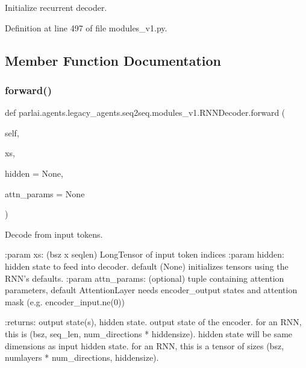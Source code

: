 \begin{DoxyVerb}Initialize recurrent decoder.\end{DoxyVerb}
 

Definition at line 497 of file modules\+\_\+v1.\+py.



\subsection{Member Function Documentation}
\mbox{\label{classparlai_1_1agents_1_1legacy__agents_1_1seq2seq_1_1modules__v1_1_1RNNDecoder_aa0fdddaf98d3385b432a9b52a0d1adbb}} 
\subsubsection{\texorpdfstring{forward()}{forward()}}
{\footnotesize\ttfamily def parlai.\+agents.\+legacy\+\_\+agents.\+seq2seq.\+modules\+\_\+v1.\+R\+N\+N\+Decoder.\+forward (\begin{DoxyParamCaption}\item[{}]{self,  }\item[{}]{xs,  }\item[{}]{hidden = {\ttfamily None},  }\item[{}]{attn\+\_\+params = {\ttfamily None} }\end{DoxyParamCaption})}

\begin{DoxyVerb}Decode from input tokens.

:param xs:          (bsz x seqlen) LongTensor of input token indices
:param hidden:      hidden state to feed into decoder. default (None)
            initializes tensors using the RNN's defaults.
:param attn_params: (optional) tuple containing attention parameters,
            default AttentionLayer needs encoder_output states
            and attention mask (e.g. encoder_input.ne(0))

:returns:           output state(s), hidden state.
            output state of the encoder. for an RNN, this is
            (bsz, seq_len, num_directions * hiddensize).
            hidden state will be same dimensions as input
            hidden state. for an RNN, this is a tensor of sizes
            (bsz, numlayers * num_directions, hiddensize).
\end{DoxyVerb}
 

